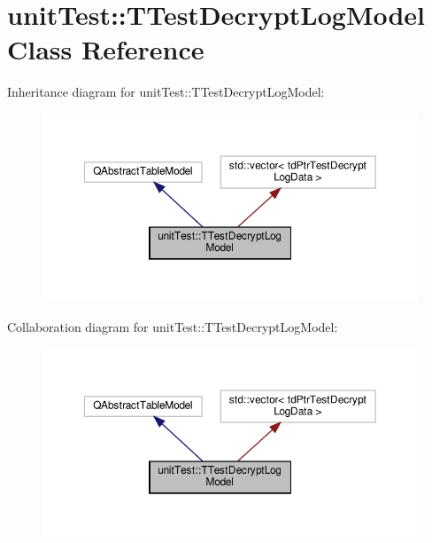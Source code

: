 \hypertarget{classunit_test_1_1_t_test_decrypt_log_model}{}\section{unit\+Test\+:\+:T\+Test\+Decrypt\+Log\+Model Class Reference}
\label{classunit_test_1_1_t_test_decrypt_log_model}


Inheritance diagram for unit\+Test\+:\+:T\+Test\+Decrypt\+Log\+Model\+:\nopagebreak
\begin{figure}[H]
\begin{center}
\leavevmode
\includegraphics[width=350pt]{classunit_test_1_1_t_test_decrypt_log_model__inherit__graph}
\end{center}
\end{figure}


Collaboration diagram for unit\+Test\+:\+:T\+Test\+Decrypt\+Log\+Model\+:\nopagebreak
\begin{figure}[H]
\begin{center}
\leavevmode
\includegraphics[width=350pt]{classunit_test_1_1_t_test_decrypt_log_model__coll__graph}
\end{center}
\end{figure}
